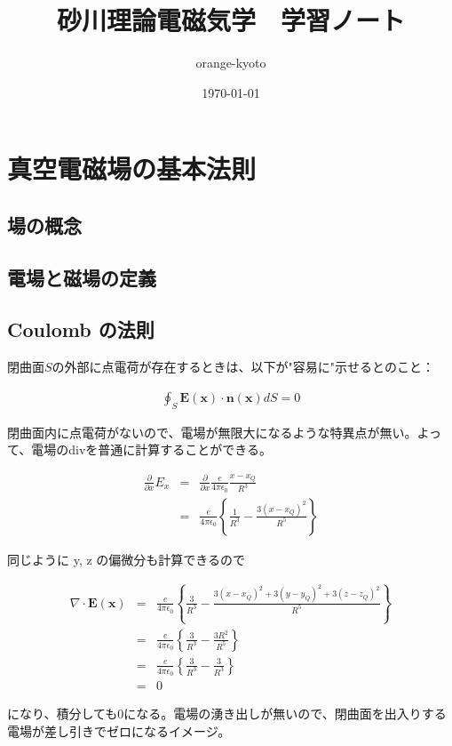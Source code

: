 \documentclass[a4j,12pt,uplatex,dvipdfmx]{jsreport}
\title{砂川理論電磁気学　学習ノート}
\author{orange-kyoto}
\date{\today}
\begin{document}
\maketitle

\tableofcontents
\clearpage


\chapter{真空電磁場の基本法則}

\section{場の概念}

\section{電場と磁場の定義}

\section{Coulomb の法則}

閉曲面$S$の外部に点電荷が存在するときは、以下が"容易に"示せるとのこと：

\begin{eqnarray*}
    \oint_{S} \bm{E}(\bm{x}) \cdot \bm{n}(\bm{x}) dS = 0
\end{eqnarray*}

閉曲面内に点電荷がないので、電場が無限大になるような特異点が無い。よって、電場のdivを普通に計算することができる。

\begin{eqnarray*}
    \frac{\partial}{\partial x} E_{x} 
    &=& \frac{\partial}{\partial x} \frac{e}{4 \pi \epsilon_0} \frac{x - x_{Q}}{R^3} \\
    &=& \frac{e}{4 \pi \epsilon_0} \left\{ \frac{1}{R^3} - \frac{3 ( x - x_{Q} )^2}{R^5} \right\} 
\end{eqnarray*}

同じように y, z の偏微分も計算できるので

\begin{eqnarray*}
    \nabla \cdot \bm{E}(\bm{x}) &=& \frac{e}{4 \pi \epsilon_0} \left\{ \frac{3}{R^3} - \frac{3 ( x - x_{Q} )^2 + 3 ( y - y_{Q} )^2 + 3 ( z - z_{Q} )^2}{R^5} \right\} \\
    &=& \frac{e}{4 \pi \epsilon_0} \left\{ \frac{3}{R^3} - \frac{3 R^2}{R^5} \right\} \\
    &=& \frac{e}{4 \pi \epsilon_0} \left\{ \frac{3}{R^3} - \frac{3}{R^3} \right\} \\
    &=& 0
\end{eqnarray*}

になり、積分しても$0$になる。電場の湧き出しが無いので、閉曲面を出入りする電場が差し引きでゼロになるイメージ。
\end{document}
